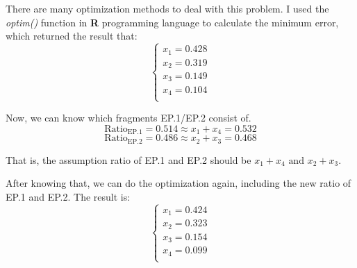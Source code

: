 \documentclass{article}
\begin{document}
            There are many optimization methods to deal with this problem. I used the \textit{optim()} function in \textbf{R} programming language to calculate the minimum error, which returned the result that:
            $$\left\{\begin{aligned}
            x_1 = 0.428\\
            x_2 = 0.319\\
            x_3 = 0.149\\
            x_4 = 0.104\\
            \end{aligned}\right.$$

            Now, we can know which fragments EP.1/EP.2 consist of.
            $$\text{Ratio}_{\text{EP.1}} = 0.514 \approx x_1 + x_4 = 0.532$$
            $$\text{Ratio}_{\text{EP.2}} = 0.486 \approx x_2 + x_3 = 0.468$$

            That is, the assumption ratio of EP.1 and EP.2 should be $x_1 + x_4 \text{ and } x_2 + x_3$.

            After knowing that, we can do the optimization again, including the new ratio of EP.1 and EP.2.
            The result is:
            $$\left\{\begin{aligned}
            x_1 = 0.424\\
            x_2 = 0.323\\
            x_3 = 0.154\\
            x_4 = 0.099\\
            \end{aligned}\right.$$
\end{document}
